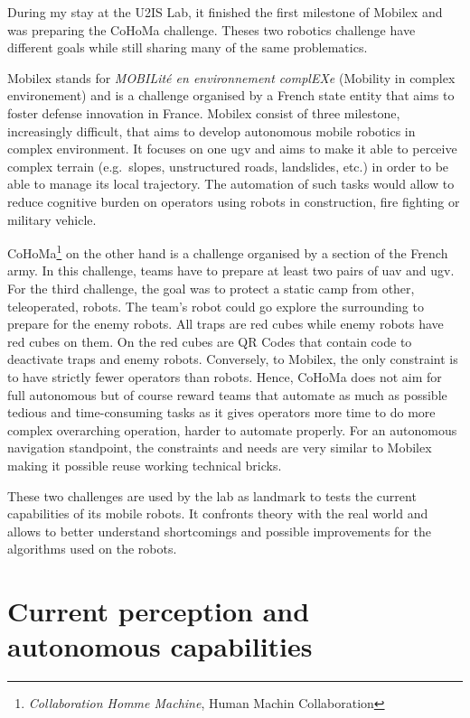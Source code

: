 During my stay at the U2IS Lab, it finished the first milestone of Mobilex and was preparing the CoHoMa challenge.
Theses two robotics challenge have different goals while still sharing many of the same problematics.

Mobilex stands for \textit{MOBILité en environnement complEXe} (Mobility in complex environement) and is a
challenge organised by a French state entity that aims to foster defense innovation in France.
Mobilex consist of three milestone, increasingly difficult, that aims to develop autonomous mobile robotics
in complex environment.
It focuses on one \gls{ugv} and aims to make it able to perceive complex terrain (e.g.\ slopes, unstructured roads, landslides, etc.) in
order to be able to manage its local trajectory.
The automation of such tasks would allow to reduce cognitive burden on operators using robots in construction,
fire fighting or military vehicle.

CoHoMa\footnote{\textit{Collaboration Homme Machine}, Human Machin Collaboration} on the other hand is a challenge organised
by a section of the French army.
In this challenge, teams have to prepare at least two pairs of \gls{uav} and \gls{ugv}.
For the third challenge, the goal was to protect a static camp from other, teleoperated, robots.
The team's robot could go explore the surrounding to prepare for the enemy robots.
All traps are red cubes while enemy robots have red cubes on them.
On the red cubes are QR Codes that contain code to deactivate traps and enemy robots.
Conversely, to Mobilex, the only constraint is to have strictly fewer operators than robots.
Hence, CoHoMa does not aim for full autonomous but of course reward teams that automate as much as possible tedious
and time-consuming tasks as it gives operators more time to do more complex overarching operation, harder to
automate properly.
For an autonomous navigation standpoint, the constraints and needs are very similar to Mobilex making it possible
reuse working technical bricks.

These two challenges are used by the lab as landmark to tests the current capabilities of its mobile robots.
It confronts theory with the real world and allows to better understand shortcomings and possible improvements
for the algorithms used on the robots.


\section{Current perception and autonomous capabilities}\label{sec:current-perception-and-autonomous-capabilities}

